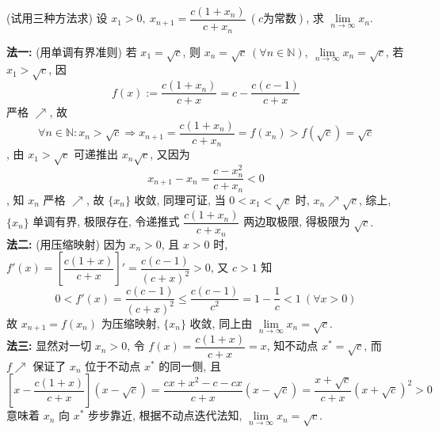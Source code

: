 \begin{example}
    (试用三种方法求) 设 $x_1>0,~x_{n+1}=\dfrac{c(1+x_n)}{c+x_n}~  (c \text{为常数})$, 求 $\lim\limits_{n\to\infty}x_n.$
\end{example}
\begin{solution}
    \textbf{法一: }(用单调有界准则) 若 $x_1=\sqrt{c}$, 则 $x_n=\sqrt{c}~  (\forall n\in\mathbb{N}),~\lim\limits_{n\to\infty}x_n=\sqrt{c}$, 
    若 $x_1>\sqrt{c}$, 因 $$f(x):=\dfrac{c(1+x_n)}{c+x}=c-\dfrac{c(c-1)}{c+x}$$ 严格 $\nearrow$, 故 $$\forall n\in\mathbb{N}:x_n>\sqrt{c}\Rightarrow x_{n+1}=\dfrac{c(1+x_n)}{c+x_n}=f(x_n)>f\left(\sqrt{c}\right)=\sqrt{c}$$, 
    由 $x_1>\sqrt{c}$ 可递推出 $x_n\sqrt{c}$, 又因为 $$x_{n+1}-x_{n}=\dfrac{c-x_n^2}{c+x_n}<0$$, 知 $x_n$ 严格 $\nearrow$, 故 $\{x_n\}$ 收敛, 
    同理可证, 当 $0<x_1<\sqrt{c}$ 时, $x_n\nearrow\sqrt{c}$, 综上, $\{x_n\}$ 单调有界, 极限存在, 令递推式 $\dfrac{c(1+x_n)}{c+x_n}$ 两边取极限, 得极限为 $\sqrt{c}.$\\
    \textbf{法二: }(用压缩映射) 因为 $x_n>0$, 且 $x>0$ 时, $f'(x)=\left[\dfrac{c(1+x)}{c+x}\right]'=\dfrac{c(c-1)}{(c+x)^2}>0$, 又 $c>1$ 知
    $$0<f'(x)=\dfrac{c(c-1)}{(c+x)^2}\leqslant\dfrac{c(c-1)}{c^2}=1-\dfrac{1}{c}<1~  (\forall x>0)$$
    故 $x_{n+1}=f(x_n)$ 为压缩映射, $\{x_n\}$ 收敛, 同上由 $\lim\limits_{n\to\infty}x_n=\sqrt{c}.$\\
    \textbf{法三: }显然对一切 $x_n>0$, 令 $f(x)=\dfrac{c(1+x)}{c+x}=x$, 知不动点 $x^*=\sqrt{c}$, 而 $f\nearrow$ 保证了 $x_n$ 位于不动点 $x^*$ 的同一侧, 且
    $$\left[x-\dfrac{c(1+x)}{c+x}\right]\left(x-\sqrt{c}\right)=\dfrac{cx+x^2-c-cx}{c+x}\left(x-\sqrt{c}\right)=\dfrac{x+\sqrt{c}}{c+x}\left(x+\sqrt{c}\right)^2>0$$
    意味着 $x_n$ 向 $x^*$ 步步靠近, 根据不动点迭代法知, $\lim\limits_{n\to\infty}x_n=\sqrt{c}.$
\end{solution}

